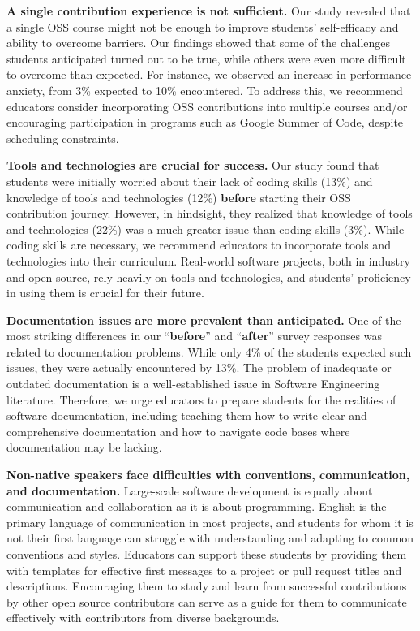 \documentclass[sigconf]{acmart}
\begin{document}
\begin{sloppy}
\textbf{A single contribution experience is not sufficient.} Our study revealed that a single OSS course might not be enough to improve students' self-efficacy and ability to overcome barriers. Our findings showed that some of the challenges students anticipated turned out to be true, while others were even more difficult to overcome than expected. For instance, we observed an increase in performance anxiety, from 3\% expected to 10\% encountered. To address this, we recommend educators consider incorporating OSS contributions into multiple courses and/or encouraging participation in programs such as Google Summer of Code, despite scheduling constraints.

\textbf{Tools and technologies are crucial for success.} Our study found that students were initially worried about their lack of coding skills (13\%) and knowledge of tools and technologies (12\%) \textbf{before } starting their OSS contribution journey. However, in hindsight, they realized that knowledge of tools and technologies (22\%) was a much greater issue than coding skills (3\%). While coding skills are necessary, we recommend educators to incorporate tools and technologies into their curriculum. Real-world software projects, both in industry and open source, rely heavily on tools and technologies, and students' proficiency in using them is crucial for their future.

\textbf{Documentation issues are more prevalent than anticipated.} One of the most striking differences in our ``\textbf{before}'' and ``\textbf{after}'' survey responses was related to documentation problems. While only 4\% of the students expected such issues, they were actually encountered by 13\%. The problem of inadequate or outdated documentation is a well-established issue in Software Engineering literature. Therefore, we urge educators to prepare students for the realities of software documentation, including teaching them how to write clear and comprehensive documentation and how to navigate code bases where documentation may be lacking.

\textbf{Non-native speakers face difficulties with conventions, communication, and documentation.} Large-scale software development is equally about communication and collaboration as it is about programming. English is the primary language of communication in most projects, and students for whom it is not their first language can struggle with understanding and adapting to common conventions and styles. Educators can support these students by providing them with templates for effective first messages to a project or pull request titles and descriptions. Encouraging them to study and learn from successful contributions by other open source contributors can serve as a guide for them to communicate effectively with contributors from diverse backgrounds.


\end{sloppy}
\end{document}

